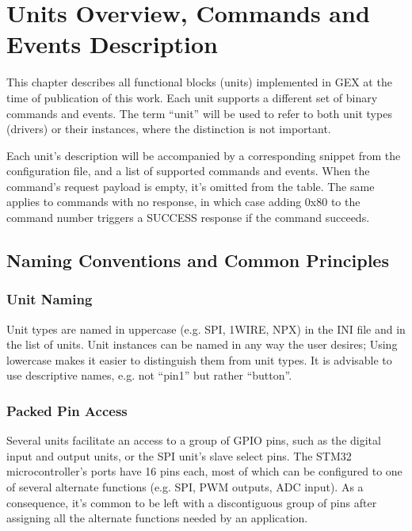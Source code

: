 \chapter{Units Overview, Commands and Events Description}

This chapter describes all functional blocks (units) implemented in GEX at the time of publication of this work. Each unit supports a different set of binary commands and events. The term ``unit'' will be used to refer to both unit types (drivers) or their instances, where the distinction is not important.


Each unit's description will be accompanied by a corresponding snippet from the configuration file, and a list of supported commands and events. When the command's request payload is empty, it's omitted from the table. The same applies to commands with no response, in which case adding 0x80 to the command number triggers a SUCCESS response if the command succeeds.

\section{Naming Conventions and Common Principles}

\subsection{Unit Naming}

Unit types are named in uppercase (e.g. SPI, 1WIRE, NPX) in the INI file and in the list of units. Unit instances can be named in any way the user desires; Using lowercase makes it easier to distinguish them from unit types. It is advisable to use descriptive names, e.g. not ``pin1'' but rather ``button''.

\subsection{Packed Pin Access}

Several units facilitate an access to a group of GPIO pins, such as the digital input and output units, or the SPI unit's slave select pins. The STM32 microcontroller's ports have 16 pins each, most of which can be configured to one of several alternate functions (e.g. SPI, PWM outputs, ADC input). As a consequence, it's common to be left with a discontiguous group of pins after assigning all the alternate functions needed by an application.

